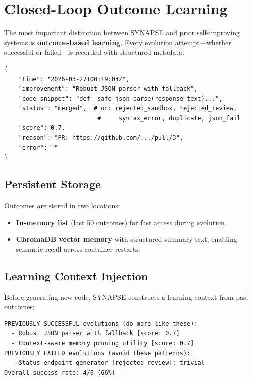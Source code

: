 \documentclass[11pt,a4paper]{article}
\begin{document}
\section{Closed-Loop Outcome Learning}
\label{sec:learning}

The most important distinction between SYNAPSE and prior self-improving systems is \textbf{outcome-based learning}. Every evolution attempt---whether successful or failed---is recorded with structured metadata:

\begin{lstlisting}[caption={Outcome record structure.}]
{
    "time": "2026-03-27T00:19:04Z",
    "improvement": "Robust JSON parser with fallback",
    "code_snippet": "def _safe_json_parse(response_text)...",
    "status": "merged",  # or: rejected_sandbox, rejected_review,
                          #     syntax_error, duplicate, json_fail
    "score": 0.7,
    "reason": "PR: https://github.com/.../pull/3",
    "error": ""
}
\end{lstlisting}

\subsection{Persistent Storage}

Outcomes are stored in two locations:
\begin{itemize}[noitemsep]
    \item \textbf{In-memory list} (last 50 outcomes) for fast access during evolution.
    \item \textbf{ChromaDB vector memory} with structured summary text, enabling semantic recall across container restarts.
\end{itemize}

\subsection{Learning Context Injection}

Before generating new code, SYNAPSE constructs a learning context from past outcomes:

\begin{lstlisting}[caption={Example learning context injected into evolution prompt.}]
PREVIOUSLY SUCCESSFUL evolutions (do more like these):
  - Robust JSON parser with fallback [score: 0.7]
  - Context-aware memory pruning utility [score: 0.7]
PREVIOUSLY FAILED evolutions (avoid these patterns):
  - Status endpoint generator [rejected_review]: trivial
Overall success rate: 4/6 (66%)
\end{lstlisting}
\end{document}
